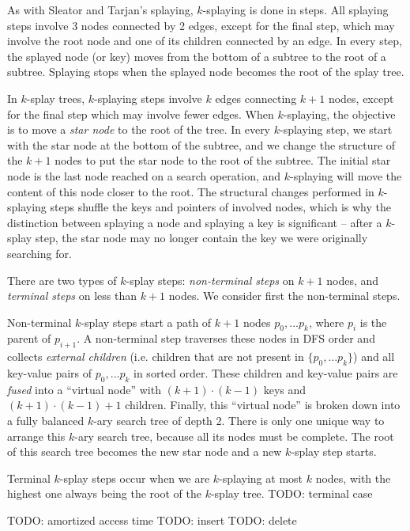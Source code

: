 As with Sleator and Tarjan's splaying, $k$-splaying is done in steps.
All splaying steps involve 3 nodes connected by 2 edges, except for the final
step, which may involve the root node and one of its children connected by
an edge. In every step, the splayed node (or key) moves from the bottom
of a subtree to the root of a subtree. Splaying stops when the splayed node
becomes the root of the splay tree.

In $k$-splay trees, $k$-splaying steps involve $k$ edges connecting
$k+1$ nodes, except for the final step which may involve fewer edges.
When $k$-splaying, the objective is to move a \emph{star node} to the
root of the tree. In every $k$-splaying step, we start with the star node
at the bottom of the subtree, and we change the structure of the $k+1$
nodes to put the star node to the root of the subtree.
The initial star node is the last node reached on a search operation, and
$k$-splaying will move the content of this node closer to the root.
The structural changes performed in $k$-splaying steps shuffle the keys and
pointers of involved nodes, which is why the distinction between splaying
a node and splaying a key is significant -- after a $k$-splay step,
the star node may no longer contain the key we were originally searching for.

There are two types of $k$-splay steps: \emph{non-terminal steps} on
$k+1$ nodes, and \emph{terminal steps} on less than $k+1$ nodes.
We consider first the non-terminal steps.

Non-terminal $k$-splay steps start a path of $k+1$ nodes $p_0,\ldots p_{k}$,
where $p_i$ is the parent of $p_{i+1}$. A non-terminal step traverses these
nodes in DFS order and collects \emph{external children} (i.e. children
that are not present in $\{p_0,\ldots p_k\}$) and all key-value pairs of
$p_0,\ldots p_k$ in sorted order.
These children and key-value pairs are \emph{fused} into a ``virtual node''
with $(k+1)\cdot (k-1)$ keys and $(k+1)\cdot(k-1) + 1$ children. Finally,
this ``virtual node'' is broken down into a fully balanced $k$-ary
search tree of depth 2. There is only one unique way to arrange this
$k$-ary search tree, because all its nodes must be complete. The root of this
search tree becomes the new star node and a new $k$-splay step starts.

Terminal $k$-splay steps occur when we are $k$-splaying at most $k$
nodes, with the highest one always being the root of the $k$-splay tree.
TODO: terminal case

TODO: amortized access time
TODO: insert
TODO: delete
